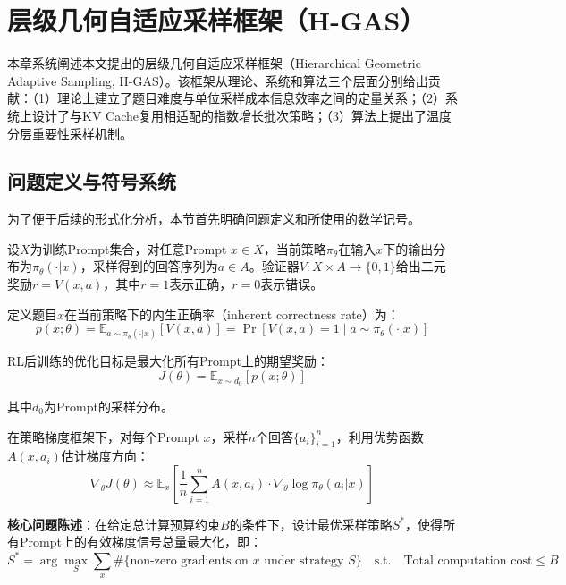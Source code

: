 \chapter{层级几何自适应采样框架（H-GAS）}
\label{chap:method}

本章系统阐述本文提出的层级几何自适应采样框架（Hierarchical Geometric Adaptive Sampling, H-GAS）。该框架从理论、系统和算法三个层面分别给出贡献：（1）理论上建立了题目难度与单位采样成本信息效率之间的定量关系；（2）系统上设计了与KV Cache复用相适配的指数增长批次策略；（3）算法上提出了温度分层重要性采样机制。

\section{问题定义与符号系统}
\label{sec:problem_definition}

为了便于后续的形式化分析，本节首先明确问题定义和所使用的数学记号。

设$X$为训练Prompt集合，对任意Prompt $x \in X$，当前策略$\pi_\theta$在输入$x$下的输出分布为$\pi_\theta(\cdot|x)$，采样得到的回答序列为$a \in A$。验证器$V: X \times A \to \{0, 1\}$给出二元奖励$r = V(x, a)$，其中$r = 1$表示正确，$r = 0$表示错误。

定义题目$x$在当前策略下的内生正确率（inherent correctness rate）为：
\begin{equation}
p(x; \theta) = \mathbb{E}_{a \sim \pi_\theta(\cdot|x)} [V(x, a)] = \Pr[V(x, a) = 1 \mid a \sim \pi_\theta(\cdot|x)]
\label{eq:inherent_rate}
\end{equation}

RL后训练的优化目标是最大化所有Prompt上的期望奖励：
\begin{equation}
J(\theta) = \mathbb{E}_{x \sim d_0} [p(x; \theta)]
\label{eq:rl_objective_formal}
\end{equation}

其中$d_0$为Prompt的采样分布。

在策略梯度框架下，对每个Prompt $x$，采样$n$个回答$\{a_i\}_{i=1}^n$，利用优势函数$A(x, a_i)$估计梯度方向：
\begin{equation}
\nabla_\theta J(\theta) \approx \mathbb{E}_x \left[ \frac{1}{n} \sum_{i=1}^n A(x, a_i) \cdot \nabla_\theta \log \pi_\theta(a_i | x) \right]
\label{eq:policy_gradient_formal}
\end{equation}

\textbf{核心问题陈述}：在给定总计算预算约束$B$的条件下，设计最优采样策略$S^*$，使得所有Prompt上的有效梯度信号总量最大化，即：
\begin{equation}
S^* = \arg\max_S \sum_x \#\{\text{non-zero gradients on } x \text{ under strategy } S\}
\quad \text{s.t.} \quad \text{Total computation cost} \leq B
\label{eq:core_problem}
\end{equation}

